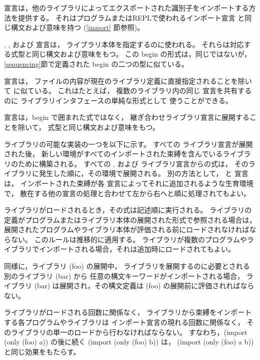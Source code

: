  宣言は，他のライブラリによってエクスポートされた識別子をインポートする方法を提供する。
それはプログラムまたはREPLで使われるインポート宣言
と同じ構文および意味を持つ (\ref{import} 節参照)。

, , および  宣言は，
ライブラリ本体を指定するのに使われる。
それらは対応する式型と同じ構文および意味をもつ。
この {\cf begin} の形式は，同じではないが，\ref{sequencing}節で定義された
{\cf begin} の二つの型に似ている。

 宣言は，
ファイルの内容が現在のライブラリ定義に直接指定されることを除いて
 に似ている。
これはたとえば，
複数のライブラリ内の同じ  宣言を共有するのに
ライブラリインタフェースの単純な形式として
使うことができる。

 宣言は，{\cf begin} で囲まれた式ではなく，
継ぎ合わせライブラリ宣言に展開することを除いて，
 式型と同じ構文および意味をもつ。


ライブラリの可能な実装の一つを以下に示す。
すべての  ライブラリ宣言が展開された後，
新しい環境がすべてのインポートされた束縛を含んでいるライブラリのために構築される。
すべての ,  および  ライブラリ宣言からの式は，
そのライブラリに発生した順に，その環境で展開される。
別の方法として， と  宣言は，
インポートされた束縛が各  宣言によってそれに追加されるような生育環境で，
散在する他の宣言の処理と合わせて左から右へと順に処理されてもよい。

ライブラリがロードされるとき，その式は記述順に実行される。
ライブラリの定義がプログラムまたはライブラリ本体の展開された形式で参照される場合は，
展開されたプログラムやライブラリ本体が評価される前にロードされなければならない。
このルールは推移的に適用する。
ライブラリが複数のプログラムやライブラリでインポートされる場合，それは追加時にロードされてもよい。

同様に，ライブラリ {\cf (foo)} の展開中，
ライブラリを展開するのに必要とされる別のライブラリ {\cf (bar)} から
任意の構文キーワードがインポートされる場合，
ライブラリ {\cf (bar)} は展開され，その構文定義は {\cf (foo)} の展開前に評価されればならない。

ライブラリがロードされる回数に関係なく，
ライブラリから束縛をインポートする各プログラムやライブラリは
インポート宣言の現れる回数に関係なく，
そのライブラリの単一のロードから行わなければならない。
すなわち，{\cf (import (only (foo) a))} の後に続く {\cf (import (only (foo) b))}
は， {\cf (import (only (foo) a b))} と同じ効果をもたらす。

